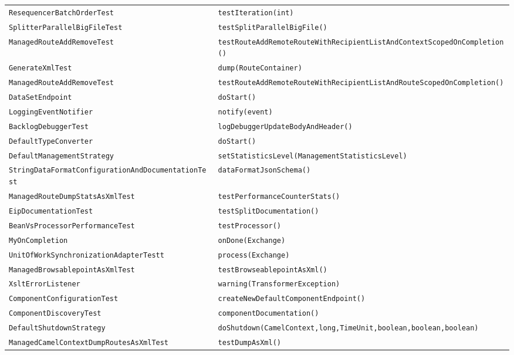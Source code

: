 \begin{center}
\begin{longtable}{ll}
\lstinline/ResequencerBatchOrderTest/&{\lstinline/testIteration(int)/}\\
\lstinline/SplitterParallelBigFileTest/&{\lstinline/testSplitParallelBigFile()/}\\
\lstinline/ManagedRouteAddRemoveTest/&{\lstinline/testRouteAddRemoteRouteWithRecipientListAndContextScopedOnCompletion()/}\\
\lstinline/GenerateXmlTest/&{\lstinline/dump(RouteContainer)/}\\
\lstinline/ManagedRouteAddRemoveTest/&{\lstinline/testRouteAddRemoteRouteWithRecipientListAndRouteScopedOnCompletion()/}\\
\lstinline/DataSetEndpoint/&{\lstinline/doStart()/}\\
\lstinline/LoggingEventNotifier/&{\lstinline/notify(event)/}\\
\lstinline/BacklogDebuggerTest/&{\lstinline/logDebuggerUpdateBodyAndHeader()/}\\
\lstinline/DefaultTypeConverter/&{\lstinline/doStart()/}\\
\lstinline/DefaultManagementStrategy/&{\lstinline/setStatisticsLevel(ManagementStatisticsLevel)/}\\
\lstinline/StringDataFormatConfigurationAndDocumentationTest/&{\lstinline/dataFormatJsonSchema()/}\\
\lstinline/ManagedRouteDumpStatsAsXmlTest/&{\lstinline/testPerformanceCounterStats()/}\\
\lstinline/EipDocumentationTest/&{\lstinline/testSplitDocumentation()/}\\
\lstinline/BeanVsProcessorPerformanceTest/&{\lstinline/testProcessor()/}\\
\lstinline/MyOnCompletion/&{\lstinline/onDone(Exchange)/}\\
\lstinline/UnitOfWorkSynchronizationAdapterTestt/&{\lstinline/process(Exchange)/}\\
\lstinline/ManagedBrowsablepointAsXmlTest/&{\lstinline/testBrowseablepointAsXml()/}\\
\lstinline/XsltErrorListener/&{\lstinline/warning(TransformerException)/}\\
\lstinline/ComponentConfigurationTest/&{\lstinline/createNewDefaultComponentEndpoint()/}\\
\lstinline/ComponentDiscoveryTest/&{\lstinline/componentDocumentation()/}\\
\lstinline/DefaultShutdownStrategy/&{\lstinline/doShutdown(CamelContext,long,TimeUnit,boolean,boolean,boolean)/}\\
\lstinline/ManagedCamelContextDumpRoutesAsXmlTest/&{\lstinline/testDumpAsXml()/}\\

\end{longtable}
\end{center}
